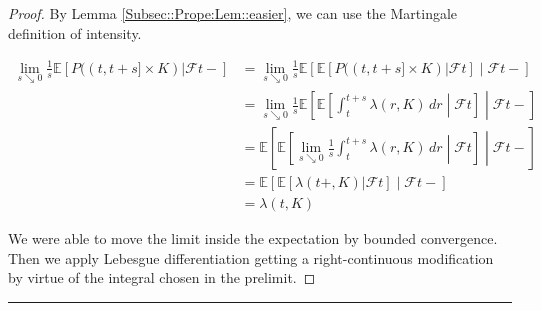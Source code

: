 \documentclass[12pt]{article}
\newcommand{\mb}{\mathbb}
\newcommand{\mc}{\mathcal}
\newcommand{\lin}{\rule{\linewidth}{0.4 pt}}
\newcommand{\ex}[1]{\mb{E}\left[#1\right]}			%
\renewcommand{\t}{t}							%
\renewcommand{\tt}{s}							%
\newcommand{\F}{\mc{F}}							%
\newcommand{\rate}{\lambda}						%
\newcommand{\rp}{P}								%
\begin{document}
\begin{proof}
By Lemma \ref{Subsec::Prope:Lem::easier}, we can use the Martingale definition of intensity.

\begin{align*}
\lim_{\tt\searrow 0}\frac{1}{\tt}\ex{\rp((\t,\t+\tt]\times K)|\F{\t-}}& = \lim_{\tt\searrow 0}\frac{1}{\tt}\ex{\ex{\rp((\t,\t+\tt]\times K)|\F{\t}}\middle|\F{\t-}}\\
&= \lim_{\tt\searrow 0}\frac{1}{\tt}\ex{\ex{\int_\t^{\t+\tt} \rate(r,K)\,dr\middle|\F{\t}}\middle|\F{\t-}}\\
&= \ex{\ex{\lim_{\tt \searrow 0} \frac{1}{\tt}\int_\t^{\t+\tt} \rate(r,K)\,dr\middle|\F{\t}}\middle|\F{\t-}}\\
&=\ex{\ex{\rate(\t+,K)|\F{\t}}\middle|\F{\t-}}\\
&=\rate(\t,K)
\end{align*}

We were able to move the limit inside the expectation by bounded convergence. Then we apply Lebesgue differentiation getting a right-continuous modification by virtue of the integral chosen in the prelimit.
\end{proof}

\lin
\end{document}
